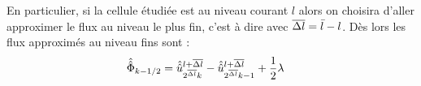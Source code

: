             En particulier, si la cellule étudiée est au niveau courant $l$ alors on choisira d'aller approximer le flux au niveau le plus fin, c'est à dire avec $\overline{\Delta l} = \bar l - l$.
            Dès lors les flux approximés au niveau fins sont : 
            \begin{align}
                \hat{\hat{\Phi}}_{k-1/2} &= \hat{\hat{u}}^{l+\overline{\Delta l}}_{2^{\overline{\Delta l}} k} -  \hat{\hat{u}}^{l+\overline{\Delta l}}_{2^{\overline{\Delta l}} k-1} + \frac{1}{2} \lambda 
            \end{align}
            
